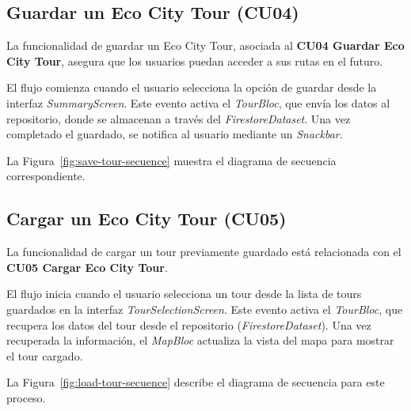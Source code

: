 \subsection{Guardar un Eco City Tour (CU04)}
La funcionalidad de guardar un Eco City Tour, asociada al \textbf{CU04 Guardar Eco City Tour}, asegura que los usuarios puedan acceder a sus rutas en el futuro.

El flujo comienza cuando el usuario selecciona la opción de guardar desde la interfaz \textit{SummaryScreen}. Este evento activa el \textit{TourBloc}, que envía los datos al repositorio, donde se almacenan a través del \textit{FirestoreDataset}. Una vez completado el guardado, se notifica al usuario mediante un \textit{Snackbar}.

La Figura~\ref{fig:save-tour-secuence} muestra el diagrama de secuencia correspondiente.


\subsection{Cargar un Eco City Tour (CU05)}
La funcionalidad de cargar un tour previamente guardado está relacionada con el \textbf{CU05 Cargar Eco City Tour}.

El flujo inicia cuando el usuario selecciona un tour desde la lista de tours guardados en la interfaz \textit{TourSelectionScreen}. Este evento activa el \textit{TourBloc}, que recupera los datos del tour desde el repositorio (\textit{FirestoreDataset}). Una vez recuperada la información, el \textit{MapBloc} actualiza la vista del mapa para mostrar el tour cargado.

La Figura~\ref{fig:load-tour-secuence} describe el diagrama de secuencia para este proceso.


